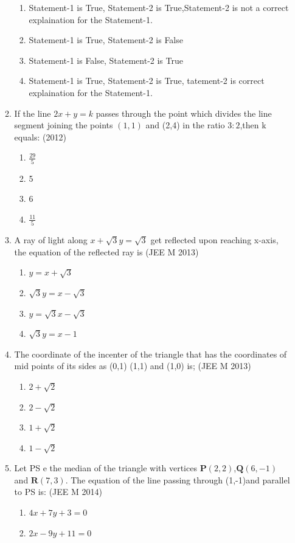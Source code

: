 \documentclass[12pt]{article}
\let\vec\mathbf
\begin{document}
\begin{enumerate}
\begin{enumerate}
\begin{enumerate}
\item Statement-1 is True, Statement-2 is True,Statement-2 is not a correct explaination for the Statement-1.
\item Statement-1 is True, Statement-2 is False
\item Statement-1 is False, Statement-2 is True
\item Statement-1 is True, Statement-2 is True, tatement-2 is correct explaination for the Statement-1.
\end{enumerate}
\item If the line $2x +y=k$ passes through the point which divides the line segment joining the points $(1,1)$ and (2,4) in the ratio $3:2$,then k equals: (2012)
\begin{enumerate}
\item $\frac{29}{5}$ 
\item 5 
\item 6 
\item $\frac{11}{5}$
\end{enumerate}
\item A ray of light along $x+\sqrt{3}y=\sqrt{3}$ get reflected upon reaching x-axis, the equation of the reflected ray is (JEE M 2013)
\begin{enumerate}
\item $y=x+\sqrt{3}$ 
\item $\sqrt{3}y=x-\sqrt{3}$ 
\item $y=\sqrt{3}x-\sqrt{3}$ 
\item $\sqrt{3}y=x-1$ 
\end{enumerate}
\item The coordinate of the incenter of the triangle that has the coordinates of mid points of its sides as (0,1) (1,1) and (1,0) is; (JEE M 2013)
\begin{enumerate}
\item $2+\sqrt{2}$
\item $2-\sqrt{2}$ 
\item $1+\sqrt{2}$ 
\item $1-\sqrt{2}$
\end{enumerate}
\item Let PS e the median of the triangle with vertices $\vec{P}(2,2)$,$\vec{Q}(6,-1)$ and $\vec{R}(7,3)$. The equation of the line passing through (1,-1)and parallel to PS is: (JEE M 2014)
\begin{enumerate}
\item $4x+7y+3=0$ 
\item $2x-9y+11=0$ 

\end{enumerate}
\end{enumerate}
\end{enumerate}
\end{document}
